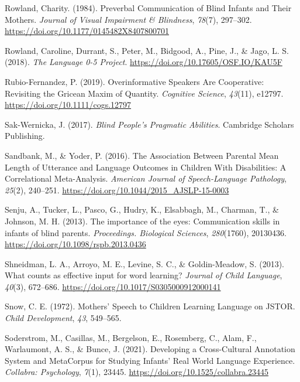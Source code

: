 \documentclass[
  man,floatsintext]{apa6}
\newlength{\cslhangindent}
\newlength{\cslentryspacingunit} %
\newenvironment{CSLReferences}[2] %
 {%
  \setlength{\parindent}{0pt}
  \ifodd #1
  \let\oldpar\par
  \def\par{\hangindent=\cslhangindent\oldpar}
  \fi
  \setlength{\parskip}{#2\cslentryspacingunit}
 }%
 {}
\begin{document}
\begin{CSLReferences}{1}{0}
\leavevmode{}%
Rowland, Charity. (1984). Preverbal {Communication} of {Blind Infants} and {Their Mothers}. \emph{Journal of Visual Impairment \& Blindness}, \emph{78}(7), 297--302. \url{https://doi.org/10.1177/0145482X8407800701}

\leavevmode{}%
Rowland, Caroline, Durrant, S., Peter, M., Bidgood, A., Pine, J., \& Jago, L. S. (2018). \emph{The {Language} 0-5 {Project}}. \url{https://doi.org/10.17605/OSF.IO/KAU5F}

\leavevmode{}%
Rubio-Fernandez, P. (2019). Overinformative {Speakers Are Cooperative}: {Revisiting} the {Gricean Maxim} of {Quantity}. \emph{Cognitive Science}, \emph{43}(11), e12797. \url{https://doi.org/10.1111/cogs.12797}

\leavevmode{}%
Sak-Wernicka, J. (2017). \emph{Blind {People}'s {Pragmatic Abilities}}. Cambridge Scholars Publishing.

\leavevmode{}%
Sandbank, M., \& Yoder, P. (2016). The {Association Between Parental Mean Length} of {Utterance} and {Language Outcomes} in {Children With Disabilities}: {A Correlational Meta-Analysis}. \emph{American Journal of Speech-Language Pathology}, \emph{25}(2), 240--251. \url{https://doi.org/10.1044/2015_AJSLP-15-0003}

\leavevmode{}%
Senju, A., Tucker, L., Pasco, G., Hudry, K., Elsabbagh, M., Charman, T., \& Johnson, M. H. (2013). The importance of the eyes: Communication skills in infants of blind parents. \emph{Proceedings. Biological Sciences}, \emph{280}(1760), 20130436. \url{https://doi.org/10.1098/rspb.2013.0436}

\leavevmode{}%
Shneidman, L. A., Arroyo, M. E., Levine, S. C., \& Goldin-Meadow, S. (2013). What counts as effective input for word learning? \emph{Journal of Child Language}, \emph{40}(3), 672--686. \url{https://doi.org/10.1017/S0305000912000141}

\leavevmode{}%
Snow, C. E. (1972). Mothers' {Speech} to {Children Learning Language} on {JSTOR}. \emph{Child Development}, \emph{43}, 549--565.

\leavevmode{}%
Soderstrom, M., Casillas, M., Bergelson, E., Rosemberg, C., Alam, F., Warlaumont, A. S., \& Bunce, J. (2021). Developing a {Cross-Cultural Annotation System} and {MetaCorpus} for {Studying Infants}' {Real World Language Experience}. \emph{Collabra: Psychology}, \emph{7}(1), 23445. \url{https://doi.org/10.1525/collabra.23445}


\end{CSLReferences}
\end{document}
